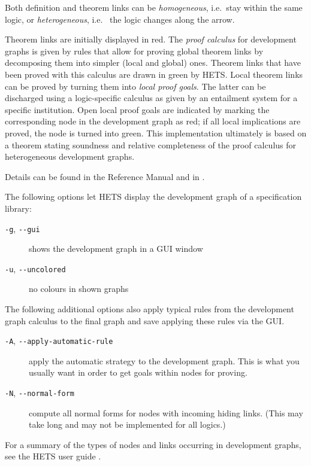 \documentclass{article}
\newcommand{\normalTEXTSC}[2]{{#1\scriptsize#2}}
\newcommand     {\Hets}{\normalTEXTSC{H}{ETS}\xspace}
\begin{document}
Both definition and theorem links can be \emph{homogeneous},
i.e.\ stay within the same logic, or \emph{heterogeneous}, i.e.\ %
the logic changes along the arrow. 

Theorem links are initially displayed in red.
The \emph{proof calculus} for development graphs
\cite{MossakowskiEtAl05,Habil} is given by rules
that allow for proving global theorem links by decomposing them
into simpler (local and global) ones. Theorem links that have been
proved with this calculus are drawn in green by {\Hets}. Local theorem links can
be proved by turning them into \emph{local proof goals}.  The latter
can be discharged using a logic-specific calculus as given by an
entailment system for a specific institution. Open local
proof goals are indicated by marking the corresponding node in the
development graph as red; if all local implications are proved, the
node is turned into green. This implementation ultimately is based
on a theorem \cite{Habil} stating soundness and relative completeness
of the proof calculus for heterogeneous development graphs.

Details can be found in the \CASL Reference Manual \cite[IV:4]{CASL/RefManual}
and in \cite{Habil,MossakowskiEtAl05,MossakowskiEtAl07b}.

The following options let \Hets display the development graph of
a specification library:
\begin{description}
\item[\texttt{-g}, \texttt{-{}-gui}] shows the development graph in a GUI window
\item[\texttt{-u}, \texttt{-{}-uncolored}] no colours in shown graphs
\end{description}

The following additional options also apply typical rules from the development
graph calculus to the final graph and save applying these rules via the GUI.
\begin{description}
\item[\texttt{-A}, \texttt{-{}-apply-automatic-rule}] apply the automatic
  strategy to the development graph. This is what you usually want in order to
  get goals within nodes for proving.
\item[\texttt{-N}, \texttt{-{}-normal-form}] compute all normal forms for nodes
  with incoming hiding links. (This may take long and may not be implemented
  for all logics.)
\end{description}

For a summary of the types of nodes and links occurring in
development graphs, see the \Hets user guide \cite{HetsUserGuide}.\\
\end{document}
